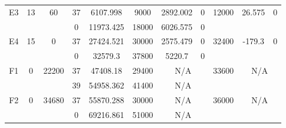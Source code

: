 \begin{sidewaystable}
\begin{tabular}{c||c|c||c|c|c|c|c||c|c|c}
         &
        
      \\
      \hline
      \multirow{2}{*}{E3} &
      \multirow{2}{*}{13} &
      \multirow{2}{*}{60} &
      37 &
      6107.998 &
      9000 &
        2892.002 &
        0 &
      \multirow{2}{*}{12000} &
        \multirow{2}{*}{26.575} &
        \multirow{2}{*}{0}
      \\
      \cline{4-8}
       &
       &
       &
      0 &
      11973.425 &
      18000 &
        6026.575 &
        0 &
      
         &
        
      \\
      \hline
      \multirow{2}{*}{E4} &
      \multirow{2}{*}{15} &
      \multirow{2}{*}{0} &
      37 &
      27424.521 &
      30000 &
        2575.479 &
        0 &
      \multirow{2}{*}{32400} &
        \multirow{2}{*}{-179.3} &
        \multirow{2}{*}{0}
      \\
      \cline{4-8}
       &
       &
       &
      0 &
      32579.3 &
      37800 &
        5220.7 &
        0 &
      
         &
        
      \\
      \hline
      \multirow{2}{*}{F1} &
      \multirow{2}{*}{0} &
      \multirow{2}{*}{22200} &
      37 &
      47408.18 &
      29400 &
        \multicolumn{2}{|c||}{N/A} &
      \multirow{2}{*}{33600} &
        \multicolumn{2}{c}{\multirow{2}{*}{N/A}}
      \\
      \cline{4-8}
       &
       &
       &
      39 &
      54958.362 &
      41400 &
        \multicolumn{2}{|c||}{N/A} &
      
        
      \\
      \hline
      \multirow{2}{*}{F2} &
      \multirow{2}{*}{0} &
      \multirow{2}{*}{34680} &
      37 &
      55870.288 &
      30000 &
        \multicolumn{2}{|c||}{N/A} &
      \multirow{2}{*}{36000} &
        \multicolumn{2}{c}{\multirow{2}{*}{N/A}}
      \\
      \cline{4-8}
       &
       &
       &
      0 &
      69216.861 &
      51000 &
        \multicolumn{2}{|c||}{N/A} &
      
        
      \\
\end{tabular}
\label{table:RDS2.txt-7337.tex} 
\end{sidewaystable}